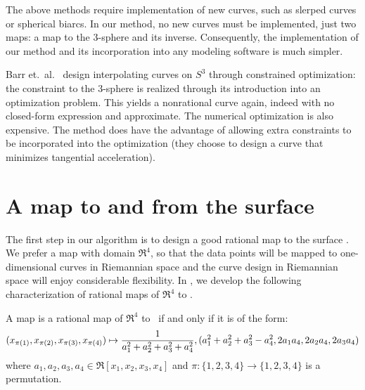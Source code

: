 The above methods require implementation of new curves,
such as slerped curves or spherical biarcs.
In our method, no new curves must be implemented, just two maps:
a map to the 3-sphere and its inverse.
Consequently, the implementation of our method and its incorporation
into any modeling software is much simpler.

Barr et.\ al.\ \cite{barr92} design interpolating curves on $S^3$ 
through constrained optimization: the constraint to the 3-sphere 
is realized through its introduction into an optimization problem.
This yields a nonrational curve again, indeed with no closed-form expression
and approximate.
The numerical optimization is also expensive.
The method does have the advantage of allowing extra constraints 
to be incorporated into the optimization (they choose to design a curve
that minimizes tangential acceleration).


\section{A map to and from the surface}
\label{sec:map}

The first step in our algorithm is to design a good rational map to the 
surface .
We prefer a map with domain $\Re^4$, so that the data points will be
mapped to one-dimensional curves in Riemannian space and the 
curve design in Riemannian space will enjoy considerable flexibility.
In \cite{jj98a}, we develop the following characterization of rational
maps of $\Re^4$ to .

\begin{theorem}
\label{thm:map4}
A map is a rational map of $\Re^4$ to \ if and only if
it is of the form:
\begin{equation}
\label{eq:re4s3}
\footnotesize{(x_{\pi(1)},x_{\pi(2)},x_{\pi(3)},x_{\pi(4)})} \mapsto 
\footnotesize{
	\frac{1}{a_1^2 + a_2^2 + a_3^2 + a_4^2},
	(a_1^2 + a_2^2 + a_3^2 - a_4^2, 2a_1a_4, 2a_2a_4, 2a_3a_4)
	}
\end{equation}
where $a_1,a_2,a_3,a_4 \in \Re[x_1,x_2,x_3,x_4]$
and $\pi : \{1,2,3,4\} \rightarrow \{1,2,3,4\}$ is a permutation.
\end{theorem}

